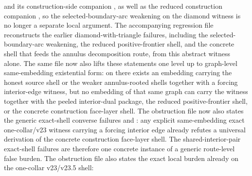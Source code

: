 \documentclass[11pt]{article}
\begin{document}
and its construction-side companion
,
as well as the reduced construction companion
,
so the selected-boundary-arc weakening on the diamond witness is no longer a
separate local argument.  The accompanying regression file
 reconstructs the
earlier diamond-with-triangle failures, including the selected-boundary-arc
weakening, the reduced positive-frontier shell, and the concrete
 shell that feeds the
annulus decomposition route, from this abstract witness alone.  The same file
now also lifts these statements one level up to
graph-level same-embedding existential form: on 
there exists an embedding carrying the honest source shell or the weaker
annulus-rooted shells together with a forcing interior-edge witness, but no
embedding of that same graph can carry the witness together with the peeled
interior-dual package, the reduced positive-frontier shell, or the concrete
construction face-layer shell.  The obstruction file now also states the
generic exact-shell converse failures
and
:
any explicit same-embedding exact one-collar/v23 witness carrying a forcing
interior edge already refutes a universal derivation of the concrete
construction face-layer shell.  The shared-interior-pair exact-shell failures
are therefore one concrete instance of a generic route-level false burden.
The obstruction file also states the
exact local burden already on the one-collar v23/v23.5 shell:
\end{document}
